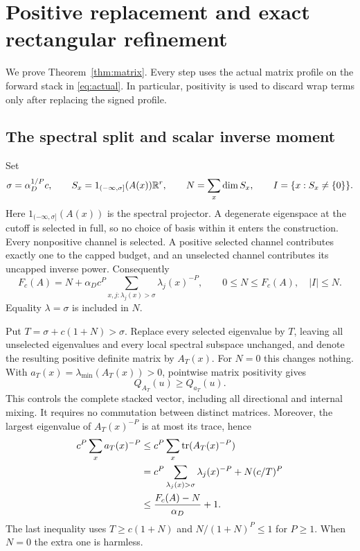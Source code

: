 \section{Positive replacement and exact rectangular refinement}\label{sec:matrixproof}
We prove Theorem~\ref{thm:matrix}. Every step uses the actual matrix profile
on the forward stack in \eqref{eq:actual}. In particular, positivity is
used to discard wrap terms only after replacing the signed profile.

\subsection{The spectral split and scalar inverse moment}
Set
\[
 \sigma=\alpha_D^{1/P}c,
 \qquad S_x=1_{(-\infty,\sigma]}(A(x))\mathbb R^r,
 \qquad N=\sum_x\dim S_x,\qquad I=\{x:S_x\ne\{0\}\}.
\]
Here $1_{(-\infty,\sigma]}(A(x))$ is the spectral projector. A degenerate
eigenspace at the cutoff is selected in full, so no choice of basis within
it enters the construction. Every nonpositive channel is selected. A positive
selected channel contributes exactly one to the capped budget, and an
unselected channel contributes its uncapped inverse power. Consequently
\begin{equation}\label{eq:cap-exact}
 F_c(A)=N+\alpha_Dc^P
                \sum_{x,j:\lambda_j(x)>\sigma}\lambda_j(x)^{-P},
 \qquad 0\le N\le F_c(A),\quad |I|\le N.
\end{equation}
Equality $\lambda=\sigma$ is included in $N$.

Put $T=\sigma+c(1+N)>\sigma$. Replace every selected eigenvalue by $T$,
leaving all unselected eigenvalues and every local spectral subspace
unchanged, and denote the resulting positive definite matrix by $A_T(x)$.
For $N=0$ this changes nothing. With
$a_T(x)=\lambda_{\min}(A_T(x))>0$, pointwise matrix positivity gives
\begin{equation}\label{eq:scalar-domination}
 Q_{A_T}(u)\ge Q_{a_T}(u).
\end{equation}
This controls the complete stacked vector, including all directional and
internal mixing. It requires no commutation between distinct matrices.
Moreover, the largest eigenvalue of $A_T(x)^{-P}$ is at most its trace, hence
\begin{align}\label{eq:replacement-moment}
 c^P\sum_xa_T(x)^{-P}
 &\le c^P\sum_x\operatorname{tr}(A_T(x)^{-P})\nonumber\\
 &=c^P\sum_{\lambda_j(x)>\sigma}\lambda_j(x)^{-P}
                  +N(c/T)^P\\
 &\le \frac{F_c(A)-N}{\alpha_D}+1.\nonumber
\end{align}
The last inequality uses $T\ge c(1+N)$ and
$N/(1+N)^P\le1$ for $P\ge1$. When $N=0$ the extra one is harmless.


